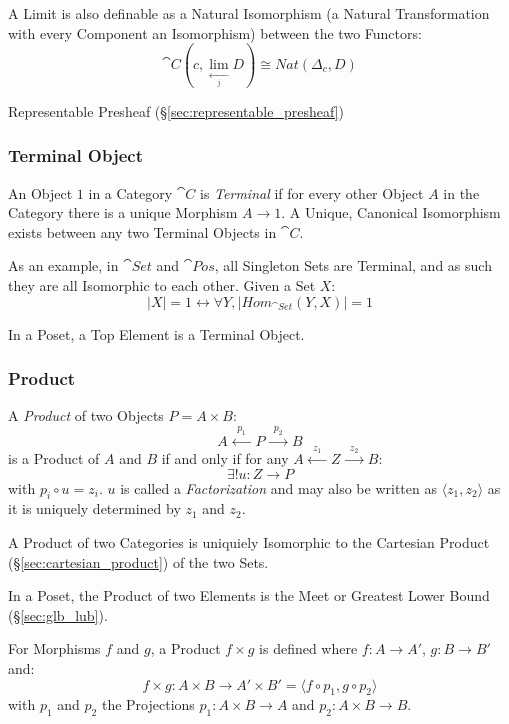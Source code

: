 A Limit is also definable as a Natural Isomorphism (a Natural
Transformation with every Component an Isomorphism) between the two
Functors:
\[
  \cat{C}(c, \lim_{\xleftarrow[j]{}} D) \cong Nat (\Delta_c, D)
\]

Representable Presheaf (\S\ref{sec:representable_presheaf})



\subsubsection{Terminal Object}\label{sec:terminal_object}

An Object $1$ in a Category $\cat{C}$ is \emph{Terminal} if for
every other Object $A$ in the Category there is a unique Morphism $A
\rightarrow 1$. A Unique, Canonical Isomorphism exists between any two
Terminal Objects in $\cat{C}$.

As an example, in $\cat{Set}$ and $\cat{Pos}$, all Singleton
Sets are Terminal, and as such they are all Isomorphic to each other.
Given a Set $X$:
\[
  |X| = 1 \leftrightarrow \forall Y, |Hom_{\cat{Set}}(Y,X)| = 1
\]

In a Poset, a Top Element is a Terminal Object.



\subsubsection{Product}\label{sec:product}

A \emph{Product} of two Objects $P = A \times B$:
\[
  A \xleftarrow{\;\;p_1\;\;} P \xrightarrow{\;\;p_2\;\;} B
\]
is a Product of $A$ and $B$ if and only if for any $A
\xleftarrow{\;\;z_1\;\;} Z \xrightarrow{\;\;z_2\;\;} B$:
\[
  \exists!u : Z \rightarrow P
\]
with $p_i \circ u = z_i$. $u$ is called a \emph{Factorization} and may
also be written as $\langle z_1, z_2 \rangle$ as it is uniquely
determined by $z_1$ and $z_2$.

A Product of two Categories is uniquiely Isomorphic to the Cartesian
Product (\S\ref{sec:cartesian_product}) of the two Sets.

In a Poset, the Product of two Elements is the Meet or Greatest Lower
Bound (\S\ref{sec:glb_lub}).

For Morphisms $f$ and $g$, a Product $f \times g$ is defined where $f
: A \rightarrow A'$, $g : B \rightarrow B'$ and:
\[
  f \times g : A \times B \rightarrow A' \times B' =
  \langle f \circ p_1, g \circ p_2 \rangle
\]
with $p_1$ and $p_2$ the Projections $p_1 : A \times B \rightarrow A$
and $p_2 : A \times B \rightarrow B$.

